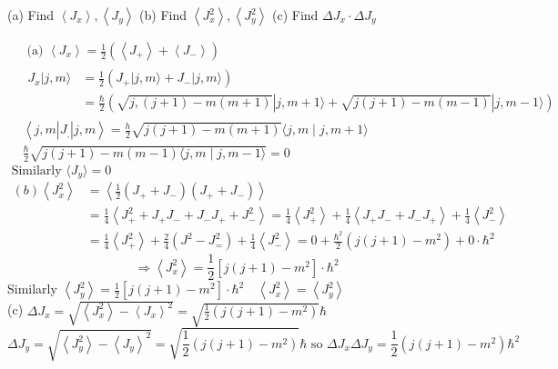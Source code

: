 \begin{exercise}
 (a) Find $\left\langle J_{x}\right\rangle,\left\langle J_{y}\right\rangle$
	(b) Find $\left\langle J_{x}^{2}\right\rangle,\left\langle J_{y}^{2}\right\rangle$
	(c) Find $\Delta J_{x} \cdot \Delta J_{y}$
\end{exercise}
\begin{answer}
	$$\begin{aligned}
		&\text { (a) }\left\langle J_{x}\right\rangle=\frac{1}{2}\left(\left\langle J_{+}\right\rangle+\left\langle J_{-}\right\rangle\right) \\
		&\begin{aligned}
			J_{x}|j, m\rangle &=\frac{1}{2}\left(J_{+}|j, m\rangle+J_{-}|j, m\rangle\right) \\
			&=\frac{\hbar}{2}(\sqrt{j,(j+1)-m(m+1)}|j, m+1\rangle+\sqrt{j(j+1)-m(m-1)}|j, m-1\rangle)
		\end{aligned} \\
		&\left\langle j, m\left|J_{,}\right| j, m\right\rangle=\frac{h}{2} \sqrt{j(j+1)-m(m+1)}\langle j, m \mid j, m+1\rangle \\
		&\frac{\hbar}{2} \sqrt{j(j+1)-m(m-1)\langle j, m \mid j, m-1\rangle}=0
	\end{aligned}$$
	$\text { Similarly }\langle J_{y}\rangle=0$\\
	$\begin{aligned}
	(b)	\left\langle J_{x}^{2}\right\rangle &=\left\langle\frac{1}{2}\left(J_{+}+J_{-}\right)\left(J_{+}+J_{-}\right)\right\rangle \\
		&=\frac{1}{4}\left\langle J_{+}^{2}+J_{+} J_{-}+J_{-} J_{+}+J_{-}^{2}\right\rangle=\frac{1}{4}\left\langle J_{+}^{2}\right\rangle+\frac{1}{4}\left\langle J_{+} J_{-}+J_{-} J_{+}\right\rangle+\frac{1}{4}\left\langle J_{-}^{2}\right\rangle \\
		&=\frac{1}{4}\left\langle J_{+}^{2}\right\rangle+\frac{2}{4}\left(J^{2}-J_{=}^{2}\right)+\frac{1}{4}\left\langle J_{-}^{2}\right\rangle=0+\frac{\hbar^{2}}{2}\left(j(j+1)-m^{2}\right)+0 \cdot \hbar^{2}
	\end{aligned}$\\
	$$
	\Rightarrow\left\langle J_{x}^{2}\right\rangle=\frac{1}{2}\left[j(j+1)-m^{2}\right] \cdot \hbar^{2}
	$$
	Similarly $\left\langle J_{y}^{2}\right\rangle=\frac{1}{2}\left[j(j+1)-m^{2}\right] \cdot \hbar^{2} \quad\left\langle J_{x}^{2}\right\rangle=\left\langle J_{y}^{2}\right\rangle$\\
	(c) $\Delta J_{x}=\sqrt{\left\langle J_{x}^{2}\right\rangle-\left\langle J_{x}\right\rangle^{2}}=\sqrt{\frac{1}{2}\left(j(j+1)-m^{2}\right)} \hbar$
	$$
	\Delta J_{y}=\sqrt{\left\langle J_{y}^{2}\right\rangle-\left\langle J_{y}\right\rangle^{2}}=\sqrt{\frac{1}{2}\left(j(j+1)-m^{2}\right)} \hbar \text { so } \Delta J_{x} \Delta J_{y}=\frac{1}{2}\left(j(j+1)-m^{2}\right) \hbar^{2}
	$$
\end{answer}
